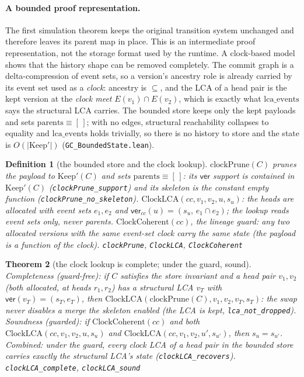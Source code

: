 \documentclass[11pt]{article}
\newtheorem{theorem}{Theorem}[section]
\newtheorem{definition}[theorem]{Definition}
\newcommand{\lean}[1]{\texttt{#1}}
\newcommand{\code}[1]{\texttt{#1}}
\begin{document}
\paragraph{A bounded proof representation.} The first simulation theorem
keeps the original transition system unchanged and therefore leaves its parent
map in place.  This is an intermediate proof representation, not the storage
format used by the runtime.  A clock-based model shows that the history shape
can be removed completely.  The commit graph is a delta-compression of event
sets, so a
version's ancestry role is already carried by its event set used as a
\emph{clock}: ancestry is $\subseteq$, and the LCA of a head pair is the
kept version at the \emph{clock meet} $E(v_1) \cap E(v_2)$, which is
exactly what $\mathrm{lca\_events}$ says the structural LCA carries. The
bounded store keeps only the kept payloads and sets $\mathrm{parents}
\equiv [\,]$; with no edges, structural reachability collapses to
equality and $\mathrm{lca\_events}$ holds trivially, so there is no
history to store and the state is $O(|\mathrm{Keep}'|)$
(\code{GC\_BoundedState.lean}).

\begin{definition}[the bounded store and the clock lookup]
\label{def:clockstore}
$\mathrm{clockPrune}(C)$ prunes the payload to $\mathrm{Keep}'(C)$
\emph{and} sets $\mathrm{parents} \equiv [\,]$: its $\mathsf{ver}$
support is contained in $\mathrm{Keep}'(C)$
(\lean{clockPrune\_support}) and its skeleton is the constant empty
function (\lean{clockPrune\_no\_skeleton}).
$\mathrm{ClockLCA}(cc, v_1, v_2, u, s_u)$: the heads are allocated with
event sets $e_1, e_2$ and $\mathsf{ver}_{cc}(u) = (s_u,\, e_1 \cap
e_2)$; the lookup reads event sets only, never parents.
$\mathrm{ClockCoherent}(cc)$, the \emph{lineage guard}: any two
allocated versions with the same event-set clock carry the same state
(the payload is a function of the clock).
\hfill\lean{clockPrune}, \lean{ClockLCA}, \lean{ClockCoherent}
\end{definition}

\begin{theorem}[the clock lookup is complete; under the guard, sound]
\label{thm:clocklca}
\emph{Completeness} (guard-free): if $C$ satisfies the store invariant
and a head pair $v_1, v_2$ (both allocated, at heads $r_1, r_2$) has a
structural LCA $v_T$ with $\mathsf{ver}(v_T) = (s_T, e_T)$, then
$\mathrm{ClockLCA}(\mathrm{clockPrune}(C), v_1, v_2, v_T, s_T)$: the
swap never disables a merge the skeleton enabled (the LCA is kept,
\lean{lca\_not\_dropped}). \emph{Soundness} (guarded): if
$\mathrm{ClockCoherent}(cc)$ and both
$\mathrm{ClockLCA}(cc, v_1, v_2, u, s_u)$ and
$\mathrm{ClockLCA}(cc, v_1, v_2, u', s_{u'})$, then $s_u = s_{u'}$.
Combined: under the guard, every clock LCA of a head pair in the
bounded store carries exactly the structural LCA's state
(\lean{clockLCA\_recovers}).
\hfill\lean{clockLCA\_complete}, \lean{clockLCA\_sound}
\end{theorem}
\end{document}
